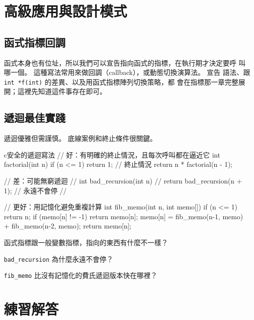 \section{高級應用與設計模式}
\label{sec:func-advanced}

\subsection{函式指標回調}

函式本身也有位址，所以我們可以宣告指向函式的指標，在執行期才決定要呼
叫哪一個。 這種寫法常用來做回調（callback），或動態切換演算法。 宣告
語法、跟 \texttt{int *f(int)} 的差異、以及用函式指標陣列切換策略，都
會在指標那一章完整展開；這裡先知道這件事存在即可。

\subsection{遞迴最佳實踐}

遞迴優雅但需謹慎。 底線案例和終止條件很關鍵。

\begin{code}{c}{安全的遞迴寫法}
// 好：有明確的終止情況，且每次呼叫都在逼近它
int factorial(int n) {
    if (n <= 1) return 1;  // 終止情況
    return n * factorial(n - 1);
}

// 差：可能無窮遞迴
// int bad_recursion(int n) {
//     return bad_recursion(n + 1);  // 永遠不會停
// }

// 更好：用記憶化避免重複計算
int fib_memo(int n, int memo[]) {
    if (n <= 1) return n;
    if (memo[n] != -1) return memo[n];
    memo[n] = fib_memo(n-1, memo) + fib_memo(n-2, memo);
    return memo[n];
}
\end{code}


\begin{drills}[label=drills:func-advanced]
\item 函式指標跟一般變數指標，指向的東西有什麼不一樣？
\item \texttt{bad\_recursion} 為什麼永遠不會停？
\item \texttt{fib\_memo} 比沒有記憶化的費氏遞迴版本快在哪裡？
\end{drills}

\section*{練習解答}

